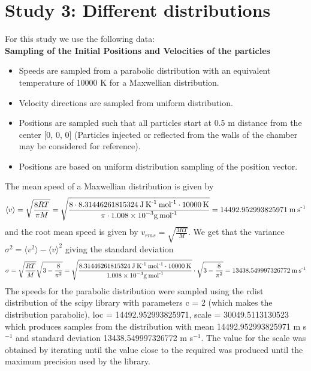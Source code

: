 \documentclass[12pt]{article}
\begin{document}
	\section{Study 3: Different distributions}
	For this study we use the following data: \\
	\noindent \textbf{Sampling of the Initial Positions and Velocities of the particles}
	\begin{itemize}
		\item Speeds are sampled from a parabolic distribution with an equivalent temperature of 10000 K for a Maxwellian distribution.
		\item Velocity directions are sampled from uniform distribution.
		\item Positions are sampled such that all particles start at 0.5 m distance from the center [0, 0, 0] (Particles injected or reflected from the walls of the chamber may be considered for reference).
		\item Positions are based on uniform distribution sampling of the position vector.
	\end{itemize}
	\noindent The mean speed of a Maxwellian distribution is given by $$\langle v \rangle = \sqrt{\displaystyle \frac{\displaystyle 8 R T}{\displaystyle \pi M}} = \sqrt{\displaystyle \frac{\displaystyle 8 \cdot 8.31446261815324 \: \mathrm{J \: K\textsuperscript{-1} \: mol\textsuperscript{-1}} \cdot 10000 \: \mathrm{K}}{\displaystyle \pi \cdot 1.008 \times 10^{-3} \mathrm{g \: mol\textsuperscript{-1}}}} = 14492.952993825971 \: \mathrm{m \: s\textsuperscript{-1}}$$ and the root mean speed is given by $v_{rms} = \sqrt{\displaystyle \frac{\displaystyle 3 R T}{\displaystyle M}}$. We get that the variance $\sigma^2 = \langle v^2 \rangle - {\langle v \rangle}^2$ giving the standard deviation $$\sigma = \sqrt{\displaystyle \frac{\displaystyle R T}{\displaystyle M}} \sqrt{3 - \frac{8}{\pi^2}} = \sqrt{\displaystyle \frac{\displaystyle 8.31446261815324 \: \mathrm{J \: K\textsuperscript{-1} \: mol\textsuperscript{-1}} \cdot 10000 \: \mathrm{K}}{\displaystyle 1.008 \times 10^{-3} \mathrm{g \: mol\textsuperscript{-1}}}} \cdot \sqrt{3 - \frac{8}{\pi^2}} = 13438.549997326772 \: \mathrm{m \: s\textsuperscript{-1}}$$
	The speeds for the parabolic distribution were sampled using the rdist distribution of the scipy library \cite{scipyRdist} with parameters c = 2 (which makes the distribution parabolic), loc = 14492.952993825971, scale = 30049.5113130523 which produces samples from the distribution with mean 14492.952993825971 m s$^{-1}$ and standard deviation 13438.549997326772 m s$^{-1}$. The value for the scale was obtained by iterating until the value close to the required was produced until the maximum precision used by the library.
\end{document}
